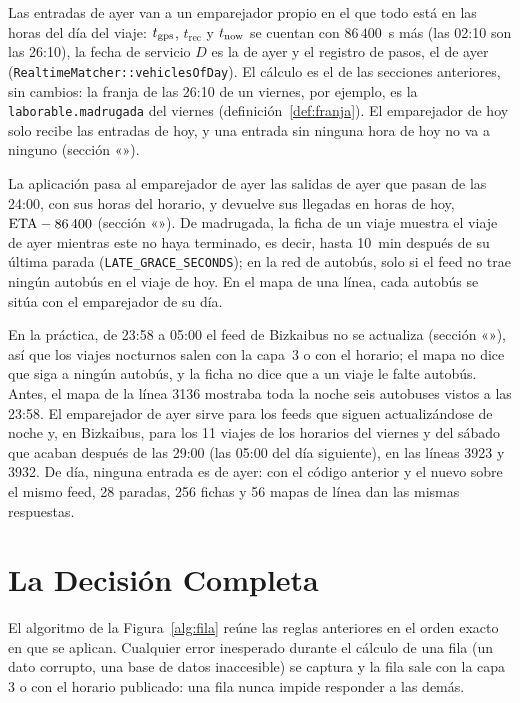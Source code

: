 Las entradas de ayer van a un emparejador propio en el que todo está en las horas del día del viaje: $t_{\mathrm{gps}}$,
$t_{\mathrm{rec}}$ y $t_{\mathrm{now}}$ se cuentan con $86\,400$~s más (las 02:10 son las 26:10), la fecha de servicio $D$ es la de ayer y
el registro de pasos, el de ayer (\texttt{RealtimeMatcher::vehiclesOfDay}). El cálculo es el de las secciones
anteriores, sin cambios: la franja de las 26:10 de un viernes, por ejemplo, es la \texttt{laborable.madrugada} del
viernes (definición~\ref{def:franja}). El emparejador de hoy solo recibe las entradas de hoy, y una entrada sin ninguna
hora de hoy no va a ninguno (sección «»).

La aplicación pasa al emparejador de ayer las salidas de ayer que pasan de las 24:00, con sus horas del horario, y
devuelve sus llegadas en horas de hoy, $\mathrm{ETA}-86\,400$ (sección «»). De madrugada, la ficha de
un viaje muestra el viaje de ayer mientras este no haya terminado, es decir, hasta 10~min después de su última parada
(\texttt{LATE\_GRACE\_SECONDS}); en la red de autobús, solo si el feed no trae ningún autobús en el viaje de hoy. En el
mapa de una línea, cada autobús se sitúa con el emparejador de su día.

En la práctica, de 23:58 a 05:00 el feed de Bizkaibus no se actualiza (sección «»), así que los
viajes nocturnos salen con la capa~3 o con el horario; el mapa no dice que siga a ningún autobús, y la ficha no dice
que a un viaje le falte autobús. Antes, el mapa de la línea 3136 mostraba toda la noche seis autobuses vistos a las
23:58. El emparejador de ayer sirve para los feeds que siguen actualizándose de noche y, en Bizkaibus, para los 11
viajes de los horarios del viernes y del sábado que acaban después de las 29:00 (las 05:00 del día siguiente), en las
líneas 3923 y 3932. De día, ninguna entrada es de ayer: con el código anterior y el nuevo sobre el mismo feed, 28 paradas, 256 fichas y 56 mapas de línea
dan las mismas respuestas.

\section{La Decisión Completa}
\label{sec:decision}

El algoritmo de la Figura~\ref{alg:fila} reúne las reglas anteriores en el orden exacto en que se aplican. Cualquier error
inesperado durante el cálculo de una fila (un dato corrupto, una base de datos inaccesible) se captura y la fila sale
con la capa 3 o con el horario publicado: una fila nunca impide responder a las demás.

